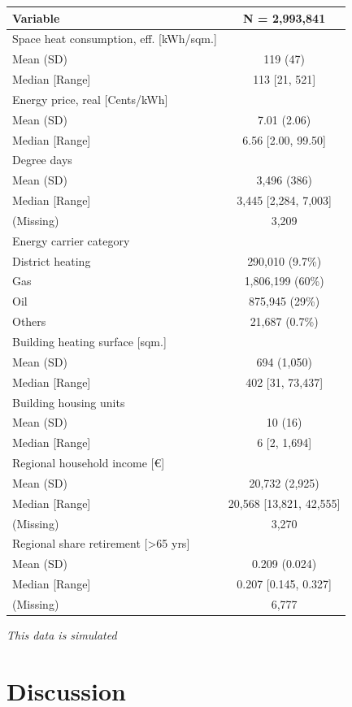 \documentclass[12pt,twoside]{reedthesis}
\begin{document}
\captionsetup[table]{labelformat=empty,skip=1pt}
\begin{longtable}{lc}
\toprule
\textbf{Variable} & \textbf{N = 2,993,841} \\ 
\midrule
Space heat consumption, eff. [kWh/sqm.] &  \\ 
Mean (SD) & 119 (47) \\ 
Median [Range] & 113 [21, 521] \\ 
Energy price, real [Cents/kWh] &  \\ 
Mean (SD) & 7.01 (2.06) \\ 
Median [Range] & 6.56 [2.00, 99.50] \\ 
Degree days &  \\ 
Mean (SD) & 3,496 (386) \\ 
Median [Range] & 3,445 [2,284, 7,003] \\ 
(Missing) & 3,209 \\ 
Energy carrier category &  \\ 
District heating & 290,010 (9.7\%) \\ 
Gas & 1,806,199 (60\%) \\ 
Oil & 875,945 (29\%) \\ 
Others & 21,687 (0.7\%) \\ 
Building heating surface [sqm.] &  \\ 
Mean (SD) & 694 (1,050) \\ 
Median [Range] & 402 [31, 73,437] \\ 
Building housing units &  \\ 
Mean (SD) & 10 (16) \\ 
Median [Range] & 6 [2, 1,694] \\ 
Regional household income [€] &  \\ 
Mean (SD) & 20,732 (2,925) \\ 
Median [Range] & 20,568 [13,821, 42,555] \\ 
(Missing) & 3,270 \\ 
Regional share retirement [>65 yrs] &  \\ 
Mean (SD) & 0.209 (0.024) \\ 
Median [Range] & 0.207 [0.145, 0.327] \\ 
(Missing) & 6,777 \\ 
 \bottomrule
\end{longtable}
\begin{minipage}{\linewidth}
\emph{This data is simulated}\\ 
\end{minipage}
\hypertarget{discussion}{%
\chapter{Discussion}\label{discussion}}
\end{document}
